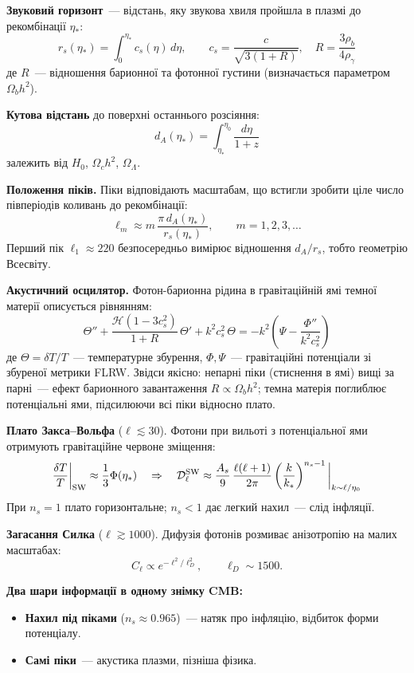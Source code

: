\documentclass[12pt, a4paper]{article}
\begin{document}
\textbf{Звуковий горизонт}~--- відстань, яку звукова хвиля пройшла
в плазмі до рекомбінації $\eta_*$:
\[
  r_s(\eta_*) = \int_0^{\eta_*} c_s(\eta)\, d\eta,
  \qquad
  c_s = \frac{c}{\sqrt{3(1 + R)}},\quad
  R = \frac{3\rho_b}{4\rho_\gamma}
\]
де $R$~--- відношення барионної та фотонної густини
(визначається параметром $\Omega_b h^2$).

\textbf{Кутова відстань} до поверхні останнього розсіяння:
\[
  d_A(\eta_*) = \int_{\eta_*}^{\eta_0} \frac{d\eta}{1+z}
\]
залежить від $H_0$, $\Omega_c h^2$, $\Omega_\Lambda$.

\textbf{Положення піків.}
Піки відповідають масштабам, що встигли зробити ціле число
півперіодів коливань до рекомбінації:
\[
  \ell_m \approx m\,\frac{\pi\, d_A(\eta_*)}{r_s(\eta_*)},
  \qquad m = 1, 2, 3, \ldots
\]
Перший пік $\ell_1 \approx 220$ безпосередньо вимірює відношення $d_A/r_s$,
тобто геометрію Всесвіту.

\textbf{Акустичний осцилятор.}
Фотон-барионна рідина в гравітаційній ямі темної матерії описується рівнянням:
\[
  \Theta'' + \frac{\mathcal{H}(1-3c_s^2)}{1+R}\,\Theta'
  + k^2 c_s^2\,\Theta
  = -k^2\!\left(\Psi - \frac{\Phi''}{k^2 c_s^2}\right)
\]
де $\Theta = \delta T/T$~--- температурне збурення,
$\Phi, \Psi$~--- гравітаційні потенціали зі збуреної метрики FLRW.
Звідси якісно:
непарні піки (стиснення в ямі) вищі за парні~--- ефект барионного
завантаження $R \propto \Omega_b h^2$;
темна матерія поглиблює потенціальні ями, підсилюючи всі піки відносно плато.

\textbf{Плато Закса--Вольфа} ($\ell \lesssim 30$).
Фотони при вильоті з потенціальної ями отримують гравітаційне червоне зміщення:
\[
  \frac{\delta T}{T}\bigg|_{\rm SW} \approx \frac{1}{3}\Phi(\eta_*)
  \quad\Rightarrow\quad
  \mathcal{D}_\ell^{\rm SW} \approx
  \frac{A_s}{9}\,\frac{\ell(\ell+1)}{2\pi}
  \left(\frac{k}{k_*}\right)^{n_s-1}\bigg|_{k \sim \ell/\eta_0}
\]
При $n_s = 1$ плато горизонтальне; $n_s < 1$ дає легкий нахил~--- слід інфляції.

\textbf{Загасання Силка} ($\ell \gtrsim 1000$).
Дифузія фотонів розмиває анізотропію на малих масштабах:
\[
  C_\ell \propto e^{-\ell^2/\ell_D^2}, \qquad \ell_D \sim 1500.
\]

\begin{keybox}
\textbf{Два шари інформації в одному знімку CMB:}
\begin{itemize}[nosep]
  \item \textbf{Нахил під піками} ($n_s \approx 0.965$)~--- натяк про інфляцію,
        відбиток форми потенціалу.
  \item \textbf{Самі піки}~--- акустика плазми, пізніша фізика.
\end{itemize}
\end{keybox}
\end{document}
